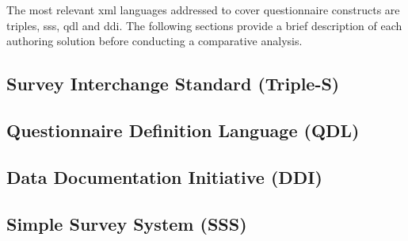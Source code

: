 	The most relevant \gls{xml} languages addressed to cover questionnaire constructs are \gls{triples}, \gls{sss}, \gls{qdl} and \gls{ddi}. The following sections provide a brief description of each authoring solution before conducting a comparative analysis.

	\subsection{Survey Interchange Standard (Triple-S)}
		
	\subsection{Questionnaire Definition Language (QDL)}
		
	\subsection{Data Documentation Initiative (DDI)}
		
	\subsection{Simple Survey System (SSS)}
		